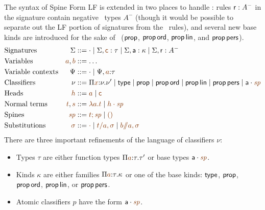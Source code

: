 The syntax of Spine Form LF is extended in two places to handle \sls:
rules ${\sf r} : A^-$ in the signature contain negative \sls~types
$A^-$ (though it would be possible to separate out the LF portion of
signatures from the \sls~rules), and several new base kinds
are introduced for the sake of \sls~(${\sf prop}$, ${\sf prop}\,{\sf
  ord}$, ${\sf prop}\,{\sf lin}$, and ${\sf prop}\,{\sf pers}$).
\begin{align*}
& \mbox{Signatures} & \Sigma & ::= \cdot 
  \mid \Sigma, \lf{\sf c} : \tau
  \mid \Sigma, {\sf a} : \kappa
  \mid \Sigma, {\sf r} : A^-
\\
& \mbox{Variables} & \lf{a}, \lf{b} & ::= \ldots
\\
& \mbox{Variable contexts} & \Psi & ::= \cdot
  \mid \Psi, \lf{a} {:} \tau 
\\
& \mbox{Classifiers} & \nu & ::= \lfpi{x}{\nu}{\nu'} \mid {\sf type}
  \mid {\sf prop}
  \mid {\sf prop}\,{\sf ord}
  \mid {\sf prop}\,{\sf lin}
  \mid {\sf prop}\,{\sf pers}
  \mid \lfroot{\sf a}{\spi}
\\
& \mbox{Heads} & \lf{h} & ::= \lf{a} \mid \lf{\sf c}
\\
& \mbox{Normal terms} & \lf{t}, \lf{s} & ::= \lf{\lambda a.t}
  \mid \lf{\lfroot{h}{\spi}}
\\
& \mbox{Spines} & \lf{\spi} & ::= \lf{t; \spi} \mid \lf{\lfnil}
\\
& \mbox{Substitutions} & \lf{\sigma} & ::= \lf{\cdot}
  \mid \lf{t/a, \sigma}
  \mid \lf{b/\!\!/a, \sigma}
\end{align*}
\noindent
There are three important refinements of the language of classifiers $\nu$:
\smallskip
\begin{itemize}
\item Types $\tau$ are either function types $\lfpi{a}{\tau}{\tau'}$
  or base types $\lfroot{\sf a}{\spi}$.
\item Kinds $\kappa$ are either families $\lfpi{a}{\tau}{\kappa}$ or
  one of the base kinds: ${\sf type}$, ${\sf prop}$, ${\sf prop}\,{\sf
    ord}$, ${\sf prop}\,{\sf lin}$, or ${\sf prop}\,{\sf pers}$.
\item Atomic classifiers $p$ have the form $\lfroot{\sf a}{\spi}$.
\end{itemize}
\smallskip

